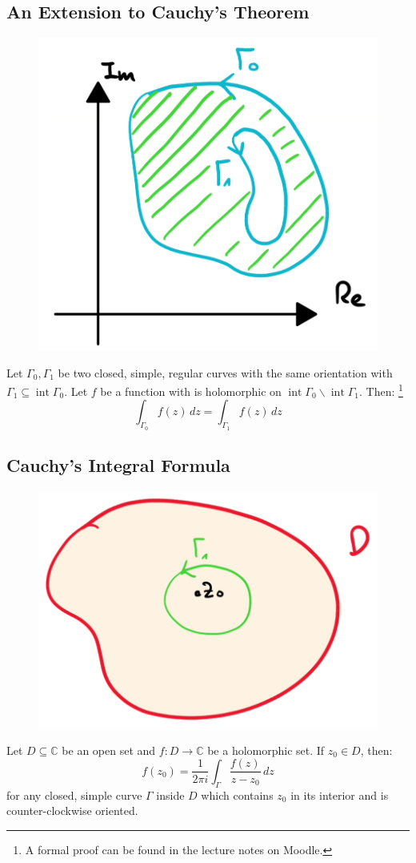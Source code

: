 \subsection{An Extension to Cauchy's Theorem}
\begin{figure}[H]
	\centering
	\includegraphics[width=0.4\linewidth]{Sketches/CauchysTheoremExtended}
	
	\label{fig:cauchystheoremextended}
\end{figure}


Let $\Gamma_0, \Gamma_1$ be two closed, simple, regular curves with the same orientation with $\Gamma_1\subseteq \operatorname{int} \Gamma_0$.
Let $f$ be a function with is holomorphic on $\operatorname{int} \Gamma_0\backslash \operatorname{int}\Gamma_1$.
Then: \footnote{A formal proof can be found in the lecture notes on Moodle.}
\begin{equation*}
	\int_{\Gamma_0} f(z)\,dz = \int_{\Gamma_1} f(z)\,dz
\end{equation*}

\subsection{Cauchy's Integral Formula}
\begin{figure}[H]
\begin{center}
	\includegraphics[width=0.3\linewidth]{Sketches/CauchyIntegralFormulas}
\end{center}
\end{figure}

Let $D \subseteq\mathbb C$ be an open set and $f:D\to \mathbb C$ be a holomorphic set. If $z_0\in D$, then:
\begin{equation*}
	f(z_0) = \frac 1{2\pi i} \int_\Gamma \frac{f(z)}{z-z_0}\,dz
\end{equation*}
for any closed, simple curve $\Gamma$ inside $D$ which contains $z_0$ in its interior and is counter-clockwise oriented.

